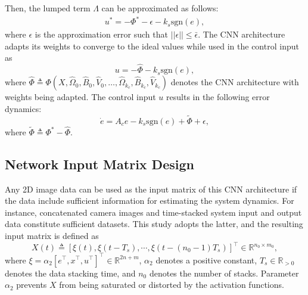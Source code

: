 \documentclass{l4dc2025}
\begin{document}
Then, the lumped term $\Lambda$ can be approximated as follows:
\begin{align}        
    u^* = -\Phi^* -\epsilon -k_s\text{sgn}(e),
\end{align}
where $\epsilon$ is the approximation error such that $||\epsilon||\le\bar\epsilon$.  
The CNN architecture adapts its weights to converge to the ideal values while used in the control input as 
\begin{equation}
u = -\hat\Phi - k_s\text{sgn}(e), \label{eq: proposed ctrl}
\end{equation}
where $\hat\Phi\triangleq \Phi(X,\hat\Omega_0,\hat B_0,\hat V_0,\dots,\hat\Omega_{k_c},\hat B_{k_c},\hat V_{k_c})$ denotes the CNN architecture with weights being adapted.
The control input $u$ results in the following error dynamics:
\begin{equation}
    \dot e = A_c e-k_s\text{sgn}(e)+\tilde \Phi +\epsilon,
    \label{eq: error dynamics with NN error}
\end{equation}
where $\tilde\Phi\triangleq \Phi^*-\hat\Phi$. 

\subsection{Network Input Matrix Design}

Any 2D image data can be used as the input matrix of this CNN architecture if the data include sufficient information for estimating the system dynamics. For instance, concatenated camera images and time-stacked system input and output data constitute sufficient datasets. This study adopts the latter, and the resulting input matrix is defined as
\begin{equation}
    X(t)\triangleq[\xi(t), \xi(t-T_s), \cdots, \xi(t-({n_0}-1) T_s)]^\top\in\mathbb{R}^{n_0\times m_0},
\end{equation}
where $\xi=\alpha_2[e^\top  ,x^\top  ,u^\top  ]^\top  \in\mathbb{R}^{2n+m}$, $\alpha_2$ denotes a positive constant, $T_s\in\mathbb{R}_{>0}$ denotes the data stacking time, and $n_0$ denotes the number of stacks.
Parameter $\alpha_2$ prevents $X$ from being saturated or distorted by the activation functions.
\end{document}
